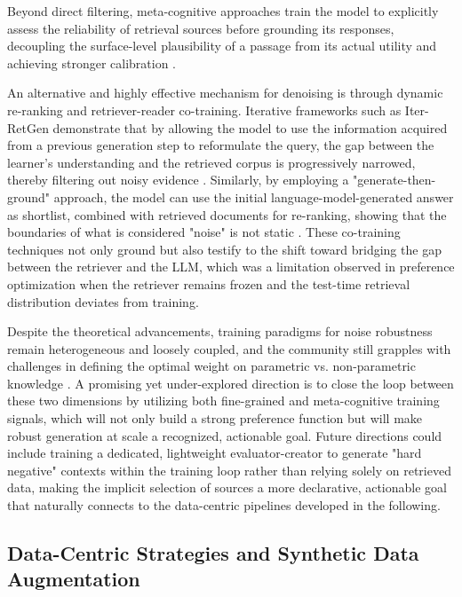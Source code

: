 \documentclass[11pt,a4paper]{article}
\begin{document}
Beyond direct filtering, meta-cognitive approaches train the model to explicitly assess the reliability of retrieval sources before grounding its responses, decoupling the surface-level plausibility of a passage from its actual utility and achieving stronger calibration \cite{arxiv:2402.11626v1}.

An alternative and highly effective mechanism for denoising is through dynamic re-ranking and retriever-reader co-training. Iterative frameworks such as Iter-RetGen demonstrate that by allowing the model to use the information acquired from a previous generation step to reformulate the query, the gap between the learner's understanding and the retrieved corpus is progressively narrowed, thereby filtering out noisy evidence \cite{arxiv:2305.15294v2,arxiv:2212.10509v2}. Similarly, by employing a "generate-then-ground" approach, the model can use the initial language-model-generated answer as shortlist, combined with retrieved documents for re-ranking, showing that the boundaries of what is considered "noise" is not static \cite{arxiv:2406.14891v2}. These co-training techniques not only ground but also testify to the shift toward bridging the gap between the retriever and the LLM, which was a limitation observed in preference optimization when the retriever remains frozen and the test-time retrieval distribution deviates from training.

Despite the theoretical advancements, training paradigms for noise robustness remain heterogeneous and loosely coupled, and the community still grapples with challenges in defining the optimal weight on parametric vs. non-parametric knowledge \cite{arxiv:2312.10997v5}. A promising yet under-explored direction is to close the loop between these two dimensions by utilizing both fine-grained and meta-cognitive training signals, which will not only build a strong preference function but will make robust generation at scale a recognized, actionable goal. Future directions could include training a dedicated, lightweight evaluator-creator to generate "hard negative" contexts within the training loop rather than relying solely on retrieved data, making the implicit selection of sources a more declarative, actionable goal that naturally connects to the data-centric pipelines developed in the following.


\subsection{Data-Centric Strategies and Synthetic Data Augmentation}
\end{document}
